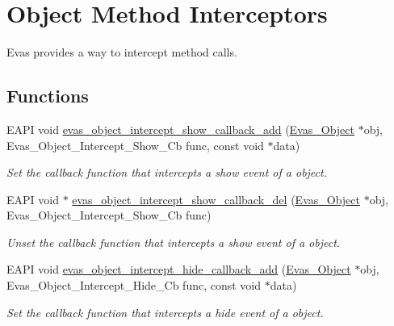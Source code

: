 \section{Object Method Interceptors}
\label{group__Evas__Object__Group__Interceptors}


Evas provides a way to intercept method calls.  


\subsection*{Functions}
\begin{DoxyCompactItemize}
\item 
EAPI void \hyperlink{group__Evas__Object__Group__Interceptors_ga3d80ec058c8c41638c8cc969be4d2920}{evas\_\-object\_\-intercept\_\-show\_\-callback\_\-add} (\hyperlink{group__Evas__Object__Group_ga9e19e6dd1f517a0ba437c0114d3e7c97}{Evas\_\-Object} $\ast$obj, Evas\_\-Object\_\-Intercept\_\-Show\_\-Cb func, const void $\ast$data)
\begin{DoxyCompactList}\small\item\em Set the callback function that intercepts a show event of a object. \item\end{DoxyCompactList}\item 
EAPI void $\ast$ \hyperlink{group__Evas__Object__Group__Interceptors_ga4816b582c3187aaad1644d2b93058e5e}{evas\_\-object\_\-intercept\_\-show\_\-callback\_\-del} (\hyperlink{group__Evas__Object__Group_ga9e19e6dd1f517a0ba437c0114d3e7c97}{Evas\_\-Object} $\ast$obj, Evas\_\-Object\_\-Intercept\_\-Show\_\-Cb func)
\begin{DoxyCompactList}\small\item\em Unset the callback function that intercepts a show event of a object. \item\end{DoxyCompactList}\item 
EAPI void \hyperlink{group__Evas__Object__Group__Interceptors_ga22e8baa1ef7a1607f8f28dac68a1f082}{evas\_\-object\_\-intercept\_\-hide\_\-callback\_\-add} (\hyperlink{group__Evas__Object__Group_ga9e19e6dd1f517a0ba437c0114d3e7c97}{Evas\_\-Object} $\ast$obj, Evas\_\-Object\_\-Intercept\_\-Hide\_\-Cb func, const void $\ast$data)
\begin{DoxyCompactList}\small\item\em Set the callback function that intercepts a hide event of a object. \item\end{DoxyCompactList}\item 

\end{DoxyCompactItemize}
